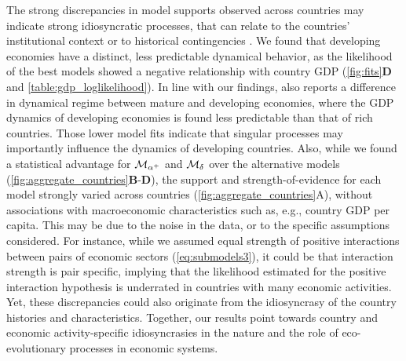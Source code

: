 The strong discrepancies in model supports observed across countries may indicate strong idiosyncratic processes, that can relate to the countries' institutional context \citep{Acemoglu2005} or to historical contingencies \citep{Silverberg2005a}. 
% 
We found that developing economies have a distinct, less predictable dynamical behavior, as the likelihood of the best models showed a negative relationship with country GDP (\cref{fig:fits}\textbf{D} and \cref{table:gdp_loglikelihood}). In line with our findings, \citep{Cristelli2015} also reports a difference in dynamical regime between mature and developing economies, where the GDP dynamics of developing economies is found less predictable than that of rich countries. Those lower model fits indicate that singular processes may importantly influence the dynamics of developing countries.
% 
% 
% 
% 
Also, while we found a statistical advantage for $\mathcal{M}_{\alpha^+}$ and $\mathcal{M}_\delta$ over the alternative models (\cref{fig:aggregate_countries}\textbf{B}-\textbf{D}), the support and strength-of-evidence for each model strongly varied across countries (\cref{fig:aggregate_countries}A), without associations with macroeconomic characteristics such as, e.g., country GDP per capita. This may be due to the noise in the data, or to the specific assumptions considered. For instance, while we assumed equal strength of positive interactions between pairs of economic sectors (\cref{eq:submodels3}), it could be that interaction strength is pair specific, implying that the likelihood estimated for the positive interaction hypothesis is underrated in countries with many economic activities. 
% 
Yet, these discrepancies could also originate from the idiosyncrasy of the country histories and characteristics.
% 
Together, our results point towards country and economic activity-specific idiosyncrasies in the nature and the role of eco-evolutionary processes in economic systems.

